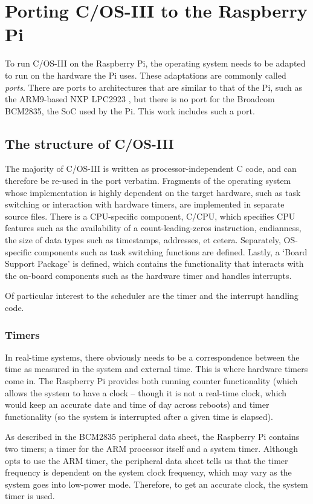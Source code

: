 \documentclass[twoside]{uva-inf-bachelor-thesis}
\newcommand{\ucosiii}{\textmu C/OS-III\xspace}
\newcommand{\ucpu}{\textmu C/CPU\xspace}
\begin{document}
%
%
%
%

\chapter{Porting \ucosiii to the Raspberry Pi}
To run \ucosiii on the Raspberry Pi, the operating system needs to be adapted to run on the hardware the Pi uses. These adaptations are commonly called \textit{ports}. There are ports to architectures that are similar to that of the Pi, such as the ARM9-based NXP LPC2923 \cite{micrium:nxplpc}, but there is no port for the Broadcom BCM2835, the SoC used by the Pi. This work includes such a port.

\section{The structure of \ucosiii}
The majority of \ucosiii is written as processor-independent C code, and can therefore be re-used in the port verbatim. Fragments of the operating system whose implementation is highly dependent on the target hardware, such as task switching or interaction with hardware timers, are implemented in separate source files. There is a CPU-specific component, \ucpu, which specifies CPU features such as the availability of a count-leading-zeros instruction, endianness, the size of data types such as timestamps, addresses, et cetera. Separately, OS-specific components such as task switching functions are defined. Lastly, a `Board Support Package' is defined, which contains the functionality that interacts with the on-board components such as the hardware timer and handles interrupts.

Of particular interest to the scheduler are the timer and the interrupt handling code.

\subsection{Timers}
In real-time systems, there obviously needs to be a correspondence between the time as measured in the system and external time. This is where hardware timers come in. The Raspberry Pi provides both running counter functionality (which allows the system to have a clock -- though it is not a real-time clock, which would keep an accurate date and time of day across reboots) and timer functionality (so the system is interrupted after a given time is elapsed).

As described in the BCM2835 peripheral data sheet, the Raspberry Pi contains two timers; a timer for the ARM processor itself and a system timer. Although \textcite{sfd:realpi} opts to use the ARM timer, the peripheral data sheet tells us\cite[p. 196]{bcm:2835peripherals} that the timer frequency is dependent on the system clock frequency, which may vary as the system goes into low-power mode. Therefore, to get an accurate clock, the system timer is used.
\end{document}
